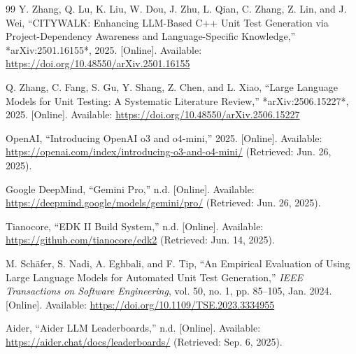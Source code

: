 \documentclass[conference]{IEEEtran}
\begin{document}
\begin{thebibliography}{99}
Y. Zhang, Q. Lu, K. Liu, W. Dou, J. Zhu, L. Qian, C. Zhang, Z. Lin, and J. Wei, 
``CITYWALK: Enhancing LLM-Based C++ Unit Test Generation via Project-Dependency Awareness and Language-Specific Knowledge,'' *arXiv:2501.16155*, 2025. 
[Online]. Available: \href{https://doi.org/10.48550/arXiv.2501.16155}{https://doi.org/10.48550/arXiv.2501.16155}

Q. Zhang, C. Fang, S. Gu, Y. Shang, Z. Chen, and L. Xiao, 
``Large Language Models for Unit Testing: A Systematic Literature Review,'' *arXiv:2506.15227*, 2025. 
[Online]. Available: \href{https://doi.org/10.48550/arXiv.2506.15227}{https://doi.org/10.48550/arXiv.2506.15227}

OpenAI, 
``Introducing OpenAI o3 and o4-mini,'' 2025. [Online]. Available: \href{https://openai.com/index/introducing-o3-and-o4-mini/}{https://openai.com/index/introducing-o3-and-o4-mini/} (Retrieved: Jun. 26, 2025).

Google DeepMind, 
``Gemini Pro,'' n.d. [Online]. Available: \href{https://deepmind.google/models/gemini/pro/}{https://deepmind.google/models/gemini/pro/} (Retrieved: Jun. 26, 2025).

Tianocore, 
``EDK II Build System,'' n.d. [Online]. Available: \href{https://github.com/tianocore/edk2}{https://github.com/tianocore/edk2} (Retrieved: Jun. 14, 2025).

M. Schäfer, S. Nadi, A. Eghbali, and F. Tip,
``An Empirical Evaluation of Using Large Language Models for Automated Unit Test Generation,''
\textit{IEEE Transactions on Software Engineering}, vol. 50, no. 1, pp. 85--105, Jan. 2024.
[Online]. Available: \href{https://doi.org/10.1109/TSE.2023.3334955}{https://doi.org/10.1109/TSE.2023.3334955}

Aider, ``Aider LLM Leaderboards,'' n.d. [Online]. Available: \href{https://aider.chat/docs/leaderboards/}{https://aider.chat/docs/leaderboards/} (Retrieved: Sep. 6, 2025).

\end{thebibliography}
\end{document}
